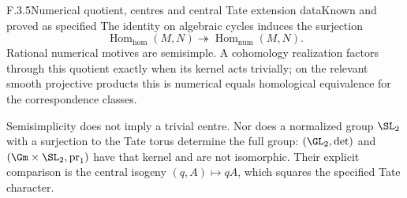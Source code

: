 \begin{result}{F.3.5}{Numerical quotient, centres and central Tate extension data}{Known and proved as specified}
The identity on algebraic cycles induces the surjection
\[
 \operatorname{Hom}_{\mathrm{hom}}(M,N)
 \twoheadrightarrow\operatorname{Hom}_{\mathrm{num}}(M,N).
\]
Rational numerical motives are semisimple. A cohomology realization factors through this quotient exactly when its kernel acts trivially; on the relevant smooth projective products this is numerical equals homological equivalence for the correspondence classes.

Semisimplicity does not imply a trivial centre. Nor does a normalized group $\SL_2$ with a surjection to the Tate torus determine the full group: $(\GL_2,\det)$ and $(\Gm\times\SL_2,\operatorname{pr}_1)$ have that kernel and are not isomorphic. Their explicit comparison is the central isogeny $(q,A)\mapsto qA$, which squares the specified Tate character.
\end{result}
